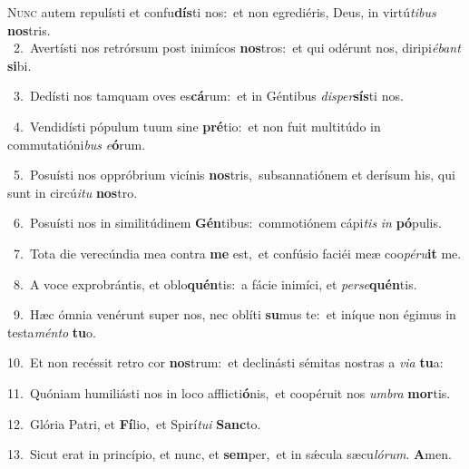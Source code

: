 \lettrine{\initial\textcolor{\initialcolor}{N}}{unc} autem repulísti et confu\-\textbf{dís}\-ti nos:~\star et non egrediéris, Deus, in virtú\-\textit{ti}\-\textit{bus} \textbf{nos}\-tris.\\
{\numbfont\textcolor{\numbcolor}{~2.}}~Avertísti nos retrórsum post inimícos \textbf{nos}\-tros:~\star et qui odérunt nos, diripi\-\textit{é}\-\textit{bant} \textbf{si}\-bi.\par
{\numbfont\textcolor{\numbcolor}{~3.}}~Dedísti nos tamquam oves es\-\textbf{cá}\-rum:~\star et in Géntibus \textit{di}\-\textit{sper}\textbf{sís}ti nos.\par
{\numbfont\textcolor{\numbcolor}{~4.}}~Vendidísti pópulum tuum sine \textbf{pré}\-tio:~\star et non fuit multitúdo in commutatióni\textit{bus} \textit{e}\-\textbf{ó}rum.\par
{\numbfont\textcolor{\numbcolor}{~5.}}~Posuísti nos oppróbrium vicínis \textbf{nos}\-tris,~\star subsannatiónem et derísum his, qui sunt in circú\-\textit{i}\-\textit{tu} \textbf{nos}\-tro.\par
{\numbfont\textcolor{\numbcolor}{~6.}}~Posuísti nos in similitúdinem \textbf{Gén}\-tibus:~\star commotiónem cápi\textit{tis} \textit{in} \textbf{pó}\-pulis.\par
{\numbfont\textcolor{\numbcolor}{~7.}}~Tota die verecúndia mea contra \textbf{me} est,~\star et confúsio faciéi meæ coo\-\textit{pé}\-\textit{ru}\textbf{it} me.\par
{\numbfont\textcolor{\numbcolor}{~8.}}~A voce exprobrántis, et oblo\-\textbf{quén}\-tis:~\star a fácie inimíci, et \textit{per}\-\textit{se}\textbf{quén}tis.\par
{\numbfont\textcolor{\numbcolor}{~9.}}~Hæc ómnia venérunt super nos, nec oblíti \textbf{su}\-mus te:~\star et iníque non égimus in testa\-\textit{mén}\-\textit{to} \textbf{tu}\-o.\par
{\numbfont\textcolor{\numbcolor}{10.}}~Et non recéssit retro cor \textbf{nos}\-trum:~\star et declinásti sémitas nostras a \textit{vi}\-\textit{a} \textbf{tu}\-a:\par
{\numbfont\textcolor{\numbcolor}{11.}}~Quóniam humiliásti nos in loco afflicti\-\textbf{ó}\-nis,~\star et coopéruit nos \textit{um}\-\textit{bra} \textbf{mor}\-tis.\par
{\numbfont\textcolor{\numbcolor}{12.}}~Glória Patri, et \textbf{Fí}\-lio,~\star et Spirí\-\textit{tu}\-\textit{i} \textbf{Sanc}\-to.\par
{\numbfont\textcolor{\numbcolor}{13.}}~Sicut erat in princípio, et nunc, et \textbf{sem}\-per,~\star et in sǽcula sæcu\-\textit{ló}\-\textit{rum}. \textbf{A}\-men.\par
